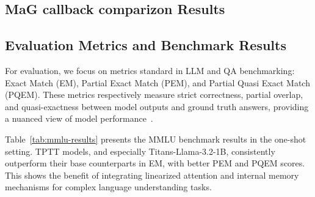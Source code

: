\documentclass[10pt,a4paper]{article}
\begin{document}


\subsection{MaG callback comparizon Results}



\subsection{Evaluation Metrics and Benchmark Results}

For evaluation, we focus on metrics standard in LLM and QA benchmarking: Exact Match (EM), Partial Exact Match (PEM), and Partial Quasi Exact Match (PQEM). These metrics respectively measure strict correctness, partial overlap, and quasi-exactness between model outputs and ground truth answers, providing a nuanced view of model performance~\cite{hendrycks2020measuring}.

Table~\ref{tab:mmlu-results} presents the MMLU benchmark results in the one-shot setting. TPTT models, and especially Titans-Llama-3.2-1B, consistently outperform their base counterparts in EM, with better PEM and PQEM scores. This shows the benefit of integrating linearized attention and internal memory mechanisms for complex language understanding tasks.
\end{document}
